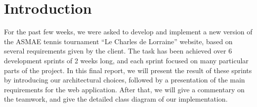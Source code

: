 \section{Introduction}
\label{sec:Introduction}


For the past few weeks, we were asked to develop and implement a new version of
the ASMAE tennis tournament \enquote{Le Charles de Lorraine} website, based on
several requirements given by the client. The task has been achieved over 6
development sprints of 2 weeks long, and each sprint focused on many particular
parts of the project. In this final report, we will present the result of these
sprints by introducing our architectural choices, followed by a presentation of
the main requirements for the web application. After that, we will give a
commentary on the teamwork, and give the detailed class diagram of our
implementation.  
